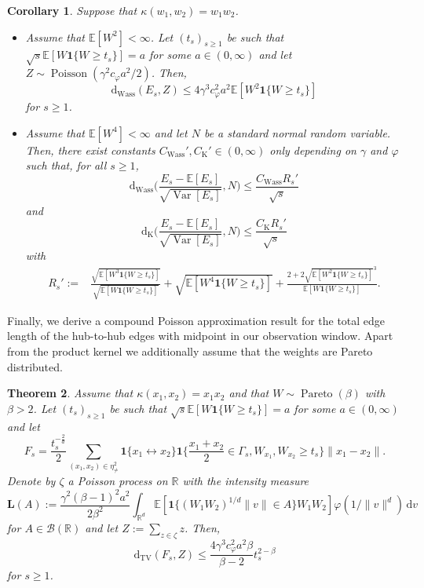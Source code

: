 \documentclass{article}
\newtheorem{theorem}{Theorem}[section]
\newtheorem{corollary}[theorem]{Corollary}
\theoremstyle{definition}
\numberwithin{equation}{section}
\theoremstyle{remark}
\begin{document}
\begin{corollary}\label{cor:hub-to-hub-edges1}
Suppose that $\kappa(w_1,w_2)=w_1w_2$.
\begin{itemize}
\item [a)] Assume that $\mathbb{E}[W^2]<\infty$. Let $(t_s)_{s\geq 1}$ be such that $\sqrt{s}\mathbb{E}[W\mathbf{1}\{W\geq t_s\}]=a$ for some $a\in(0,\infty)$ and let $Z\sim\operatorname{Poisson}(\gamma^2c_{\varphi}a^2/2)$. Then,
$$
\mathrm{d}_{\mathrm{Wass}}(E_s,Z) \leq 4\gamma^3c_{\varphi}^2 a^2 \mathbb{E}[W^2 \mathbf{1}\{W\geq t_s\}]
$$
for $s\geq 1$.
\item [b)] Assume that $\mathbb{E}[W^4]<\infty$ and let $N$ be a standard normal random variable. Then, there exist constants $C_{\mathrm{Wass}}',C_{\mathrm{K}}'\in(0,\infty)$ only depending on $\gamma$ and $\varphi$ such that, for all $s\geq 1$,
$$
\mathrm{d}_{\mathrm{Wass}}\bigg( \frac{E_s-\mathbb{E}[E_s]}{\sqrt{\operatorname{Var}[E_s]}}, N \bigg) \leq \frac{C_{\mathrm{Wass}}  R_s'}{\sqrt{s}}
$$
and
$$
\mathrm{d}_{\mathrm{K}}\bigg( \frac{E_s-\mathbb{E}[E_s]}{\sqrt{\operatorname{Var}[E_s]}}, N \bigg) \leq \frac{C_{\mathrm{K}}  R_s'}{\sqrt{s}}
$$
with 
\begin{align*}
R_s':= & \frac{\sqrt{\mathbb{E}[W^3 \mathbf{1}\{W\geq t_s\}]}}{\sqrt{\mathbb{E}[W \mathbf{1}\{W\geq t_s\}]}} + \sqrt{\mathbb{E}[W^4 \mathbf{1}\{W\geq t_s\}]} + \frac{2+2\sqrt{\mathbb{E}[W^2 \mathbf{1}\{W\geq t_s\}]}^3}{\mathbb{E}[W \mathbf{1}\{W\geq t_s\}]}.
\end{align*}
\end{itemize}
\end{corollary}


Finally, we derive a compound Poisson approximation result for the total edge length of the hub-to-hub edges with midpoint in our observation window. Apart from the product kernel we additionally assume that the weights are Pareto distributed.

\begin{theorem}\label{thm:hub-to-hub-edges2}
Assume that $\kappa(x_1,x_2)=x_1x_2$ and that $W\sim\operatorname{Pareto}(\beta)$ with $\beta>2$. Let $(t_s)_{s\geq 1}$ be such that $\sqrt{s}\mathbb{E}[W\mathbf{1}\{W\geq t_s\}]=a$ for some $a\in(0,\infty)$ and let
$$
F_s= \frac{t_s^{-\frac{2}{d}}}{2} \sum_{(x_1,x_2)\in\eta_{\neq}^2} \mathbf{1}\{x_1\leftrightarrow x_2\} \mathbf{1}\bigg\{ \frac{x_1+x_2}{2}\in \Gamma_s, W_{x_1},W_{x_2}\geq t_s\bigg\} \|x_1-x_2\|.
$$
Denote by $\zeta$ a Poisson process on $\mathbb{R}$ with the intensity measure
$$
\mathbf{L}(A) := \frac{\gamma^2(\beta-1)^2a^2}{2\beta^2} \int_{\mathbb{R}^d} \mathbb{E}[\mathbf{1}\{(W_1W_2)^{1/d}\|v\|\in A\} W_1W_2] \varphi(1/\|v\|^d) \, \mathrm{d}v
$$
for $A\in\mathcal{B}(\mathbb{R})$ and let $Z:=\sum_{z\in\zeta} z$. Then,
$$
\mathrm{d_{TV}}(F_s,Z) \leq \frac{4\gamma^3 c_\varphi^2 a^2 \beta}{\beta-2}t_s^{2-\beta}
$$
for $s\geq 1$.
\end{theorem}
\end{document}
